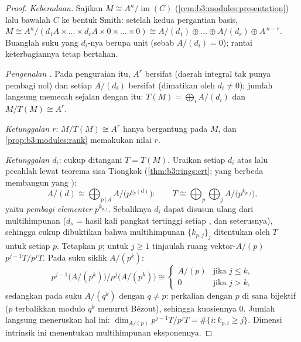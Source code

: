 \begin{proof}
\emph{Keberadaan.} Sajikan $M \cong A^n/\operatorname{im}(C)$
(\cref{rem:b3:modules:presentation}) lalu bawalah $C$ ke bentuk Smith:
setelah kedua pergantian basis, $M \cong A^n / (d_1A \times \dots
\times d_rA \times 0 \times \dots \times 0) \cong A/(d_1) \oplus
\dots \oplus A/(d_r) \oplus A^{\,n - r}$. Buanglah suku
yang $d_i$-nya berupa unit (sebab $A/(d_i) = 0$); rantai keterbagiannya
tetap bertahan.

\emph{Pengenalan .} Pada penguraian itu, $A^r$ bersifat
  (daerah integral tak punya pembagi nol) dan setiap $A/(d_i)$
bersifat  (dimatikan oleh $d_i \ne 0$); jumlah langsung memecah 
sejalan dengan itu: $T(M) = \bigoplus_i A/(d_i)$ dan $M/T(M) \cong A^r$.

\emph{Ketunggalan $r$}: $M/T(M) \cong A^r$ hanya bergantung pada $M$,
dan \cref{prop:b3:modules:rank} memakukan nilai $r$.

\emph{Ketunggalan $d_i$}: cukup ditangani 
$T = T(M)$. Uraikan setiap $d_i$ atas  lalu pecahlah lewat
teorema sisa Tiongkok (\cref{thm:b3:rings:crt};  yang berbeda
membangun  yang ):
\[
A/(d) \cong \bigoplus_{p \mid d} A/\bigl(p^{v_p(d)}\bigr):
\qquad
T \cong \bigoplus_{p} \bigoplus_{j} A/\bigl(p^{k_{p,j}}\bigr),
\]
yaitu \emph{pembagi elementer}
$p^{k_{p,j}}$. Sebaliknya $d_i$ dapat disusun ulang dari
multihimpunan  ($d_s$ = hasil kali pangkat tertinggi
setiap , dan seterusnya), sehingga cukup dibuktikan bahwa
multihimpunan $\{k_{p,j}\}_j$ ditentukan oleh $T$ untuk setiap 
$p$. Tetapkan $p$; untuk $j \geq 1$ tinjaulah ruang vektor-$A/(p)$
$p^{j-1}T/p^jT$. Pada suku siklik $A/(p^k)$:
\[
p^{j-1}\bigl(A/(p^k)\bigr)\big/p^{j}\bigl(A/(p^k)\bigr)
\cong
\begin{cases}
A/(p) & \text{jika } j \leq k,\\
0 & \text{jika } j > k,
\end{cases}
\]
sedangkan pada suku $A/(q^k)$ dengan $q \neq p$: perkalian dengan $p$ di sana
bijektif ($p$ terbalikkan modulo $q^k$ menurut Bézout), sehingga
kuosiennya $0$. Jumlah langsung meneruskan hal ini: $\dim_{A/(p)}
p^{j-1}T/p^jT = \#\{i : k_{p,i} \geq j\}$. Dimensi intrinsik ini
menentukan multihimpunan eksponennya.
\end{proof}

